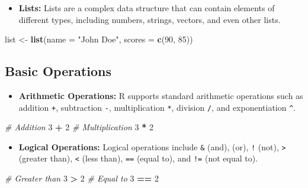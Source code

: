 \documentclass[
]{book}
\newenvironment{Shaded}{\begin{snugshade}}{\end{snugshade}}
\newcommand{\AttributeTok}[1]{\textcolor[rgb]{0.13,0.29,0.53}{#1}}
\newcommand{\CommentTok}[1]{\textcolor[rgb]{0.56,0.35,0.01}{\textit{#1}}}
\newcommand{\DecValTok}[1]{\textcolor[rgb]{0.00,0.00,0.81}{#1}}
\newcommand{\FunctionTok}[1]{\textcolor[rgb]{0.13,0.29,0.53}{\textbf{#1}}}
\newcommand{\NormalTok}[1]{#1}
\newcommand{\OtherTok}[1]{\textcolor[rgb]{0.56,0.35,0.01}{#1}}
\newcommand{\SpecialCharTok}[1]{\textcolor[rgb]{0.81,0.36,0.00}{\textbf{#1}}}
\newcommand{\StringTok}[1]{\textcolor[rgb]{0.31,0.60,0.02}{#1}}
\providecommand{\tightlist}{%
  \setlength{\itemsep}{0pt}\setlength{\parskip}{0pt}}
\begin{document}
\begin{itemize}
\tightlist
\item
  \textbf{Lists:} Lists are a complex data structure that can contain elements of different types, including numbers, strings, vectors, and even other lists.
\end{itemize}

\begin{Shaded}
\begin{Highlighting}[]
\NormalTok{list }\OtherTok{\textless{}{-}} \FunctionTok{list}\NormalTok{(}\AttributeTok{name =} \StringTok{"John Doe"}\NormalTok{, }\AttributeTok{scores =} \FunctionTok{c}\NormalTok{(}\DecValTok{90}\NormalTok{, }\DecValTok{85}\NormalTok{))}
\end{Highlighting}
\end{Shaded}

\subsection*{Basic Operations}\label{basic-operations}

\begin{itemize}
\tightlist
\item
  \textbf{Arithmetic Operations:} R supports standard arithmetic operations such as addition \texttt{+}, subtraction \texttt{-}, multiplication \texttt{*}, division \texttt{/}, and exponentiation \texttt{\^{}}.
\end{itemize}

\begin{Shaded}
\begin{Highlighting}[]
\CommentTok{\# Addition}
\DecValTok{3} \SpecialCharTok{+} \DecValTok{2}
\CommentTok{\# Multiplication}
\DecValTok{3} \SpecialCharTok{*} \DecValTok{2}
\end{Highlighting}
\end{Shaded}

\begin{itemize}
\tightlist
\item
  \textbf{Logical Operations:} Logical operations include \texttt{\&} (and), \texttt{\textbar{}} (or), \texttt{!} (not), \texttt{\textgreater{}} (greater than), \texttt{\textless{}} (less than), \texttt{==} (equal to), and \texttt{!=} (not equal to).
\end{itemize}

\begin{Shaded}
\begin{Highlighting}[]
\CommentTok{\# Greater than}
\DecValTok{3} \SpecialCharTok{\textgreater{}} \DecValTok{2}
\CommentTok{\# Equal to}
\DecValTok{3} \SpecialCharTok{==} \DecValTok{2}
\end{Highlighting}
\end{Shaded}
\end{document}
